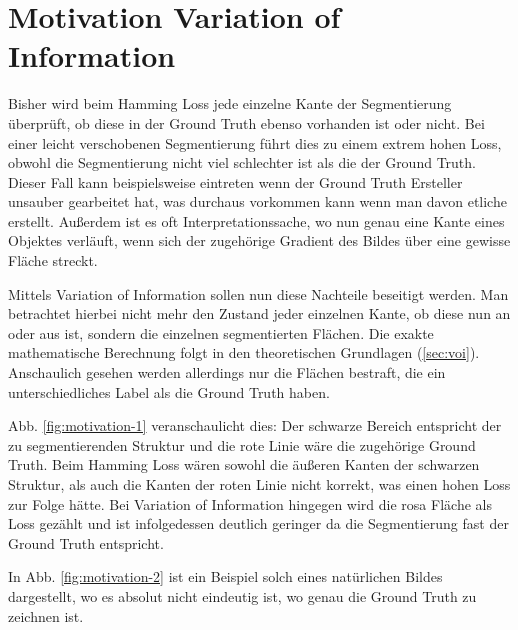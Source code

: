 \section{Motivation Variation of Information}\label{sec:motivation}

Bisher wird beim Hamming Loss jede einzelne Kante der Segmentierung überprüft, ob diese in der Ground Truth ebenso vorhanden ist oder nicht. Bei einer leicht verschobenen Segmentierung führt dies zu einem extrem hohen Loss, obwohl die Segmentierung nicht viel schlechter ist als die der Ground Truth. Dieser Fall kann beispielsweise eintreten wenn der Ground Truth Ersteller unsauber gearbeitet hat, was durchaus vorkommen kann wenn man davon etliche erstellt. Außerdem ist es oft Interpretationssache, wo nun genau eine Kante eines Objektes verläuft, wenn sich der zugehörige Gradient des Bildes über eine gewisse Fläche streckt. 

Mittels Variation of Information sollen nun diese Nachteile beseitigt werden. Man betrachtet hierbei nicht mehr den Zustand jeder einzelnen Kante, ob diese nun an oder aus ist, sondern  die einzelnen segmentierten Flächen. Die exakte mathematische Berechnung folgt in den theoretischen Grundlagen (\ref{sec:voi}). Anschaulich gesehen werden allerdings nur die Flächen bestraft, die ein unterschiedliches Label als die Ground Truth haben.

Abb. \ref{fig:motivation-1} veranschaulicht dies: Der schwarze Bereich entspricht der zu segmentierenden Struktur und die rote Linie wäre die zugehörige Ground Truth. Beim Hamming Loss wären sowohl die äußeren Kanten der schwarzen Struktur, als auch die Kanten der roten Linie nicht korrekt, was einen hohen Loss zur Folge hätte. Bei Variation of Information hingegen wird die rosa Fläche als Loss gezählt und ist infolgedessen deutlich geringer da die Segmentierung fast der Ground Truth entspricht.

In Abb. \ref{fig:motivation-2} ist ein Beispiel solch eines natürlichen Bildes dargestellt, wo es absolut nicht eindeutig ist, wo genau die Ground Truth zu zeichnen ist.


\begin{figure}[H]
	\centering
	\hfill
\end{figure}
\vspace{-0.5cm}
\label{fig:motivation}


